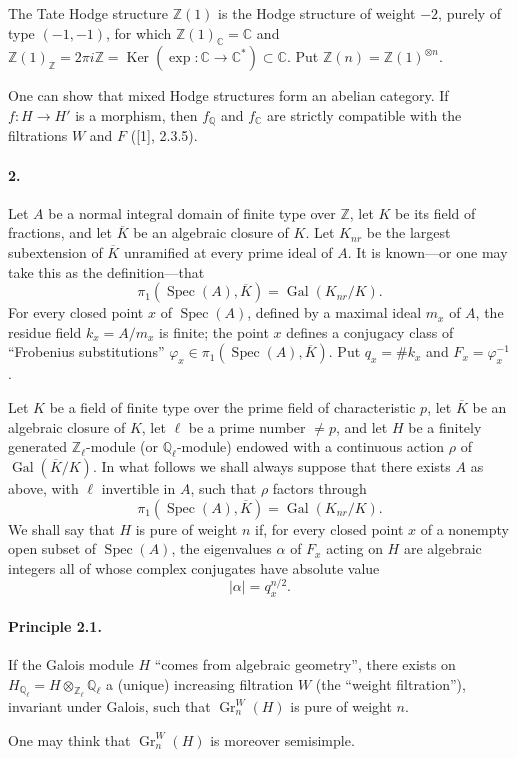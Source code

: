 \documentclass[10pt]{article}
\newcommand{\C}{\mathbb C}
\newcommand{\Q}{\mathbb Q}
\newcommand{\Z}{\mathbb Z}
\newcommand{\Ql}{\mathbb Q_\ell}
\newcommand{\Zl}{\mathbb Z_\ell}
\newcommand{\Gr}{\operatorname{Gr}}
\newcommand{\Gal}{\operatorname{Gal}}
\newcommand{\Spec}{\operatorname{Spec}}
\newcommand{\Ker}{\operatorname{Ker}}
\newcommand{\barK}{\overline{K}}
\begin{document}
The Tate Hodge structure $\Z(1)$ is the Hodge structure of weight $-2$, purely of type $(-1,-1)$, for which $\Z(1)_\C=\C$ and $\Z(1)_\Z=2\pi i\Z=\Ker(\exp:\C\to\C^*)\subset\C$. Put $\Z(n)=\Z(1)^{\otimes n}$.

One can show that mixed Hodge structures form an abelian category. If $f:H\to H'$ is a morphism, then $f_\Q$ and $f_\C$ are strictly compatible with the filtrations $W$ and $F$ ([1], 2.3.5).

\paragraph{2.} Let $A$ be a normal integral domain of finite type over $\Z$, let $K$ be its field of fractions, and let $\barK$ be an algebraic closure of $K$. Let $K_{nr}$ be the largest subextension of $\barK$ unramified at every prime ideal of $A$. It is known---or one may take this as the definition---that
\[
\pi_1(\Spec(A),\barK)=\Gal(K_{nr}/K).
\]
For every closed point $x$ of $\Spec(A)$, defined by a maximal ideal $m_x$ of $A$, the residue field $k_x=A/m_x$ is finite; the point $x$ defines a conjugacy class of ``Frobenius substitutions'' $\varphi_x\in\pi_1(\Spec(A),\barK)$. Put $q_x=\#k_x$ and $F_x=\varphi_x^{-1}$.

Let $K$ be a field of finite type over the prime field of characteristic $p$, let $\barK$ be an algebraic closure of $K$, let $\ell$ be a prime number $\ne p$, and let $H$ be a finitely generated $\Zl$-module (or $\Ql$-module) endowed with a continuous action $\rho$ of $\Gal(\barK/K)$. In what follows we shall always suppose that there exists $A$ as above, with $\ell$ invertible in $A$, such that $\rho$ factors through
\[
\pi_1(\Spec(A),\barK)=\Gal(K_{nr}/K).
\]
We shall say that $H$ is pure of weight $n$ if, for every closed point $x$ of a nonempty open subset of $\Spec(A)$, the eigenvalues $\alpha$ of $F_x$ acting on $H$ are algebraic integers all of whose complex conjugates have absolute value
\[
|\alpha|=q_x^{n/2}.
\]

\paragraph{Principle 2.1.} If the Galois module $H$ ``comes from algebraic geometry'', there exists on $H_{\Ql}=H\otimes_{\Zl}\Ql$ a (unique) increasing filtration $W$ (the ``weight filtration''), invariant under Galois, such that $\Gr_n^W(H)$ is pure of weight $n$.

One may think that $\Gr_n^W(H)$ is moreover semisimple.
\end{document}
